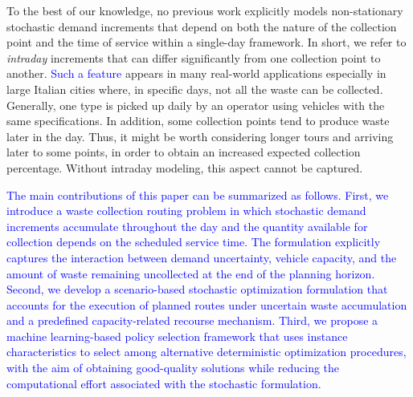 \documentclass[authoryear,preprint,12pt]{elsarticle}
\newcommand{\rev}[1]{\textcolor{blue}{{#1}}}
\begin{document}
To the best of our knowledge, no previous work explicitly models non-stationary stochastic demand increments that depend on both the nature of the collection point and the time of service within a single-day framework. In short, we refer to \textit{intraday} increments that can differ significantly from one collection point to another. \rev{Such a feature} appears in many real-world applications especially in large Italian cities where, in specific days, not all the waste can be collected. Generally, one type is picked up daily by an operator using vehicles with the same specifications.
In addition, some collection points tend to produce waste later in the day. Thus, it might be worth considering longer tours and arriving later to some points, in order to obtain an increased expected collection percentage. Without intraday modeling, this aspect cannot be captured.




\rev{The main contributions of this paper can be summarized as follows. First, we introduce a waste collection routing problem in which stochastic demand increments accumulate throughout the day and the quantity available for collection depends on the scheduled service time. The formulation explicitly captures the interaction between demand uncertainty, vehicle capacity, and the amount of waste remaining uncollected at the end of the planning horizon. Second, we develop a scenario-based stochastic optimization formulation that accounts for the execution of planned routes under uncertain waste accumulation and a predefined capacity-related recourse mechanism. Third, we propose a machine learning-based policy selection framework that uses instance characteristics to select among alternative deterministic optimization procedures, with the aim of obtaining good-quality solutions while reducing the computational effort associated with the stochastic formulation.}






\end{document}
